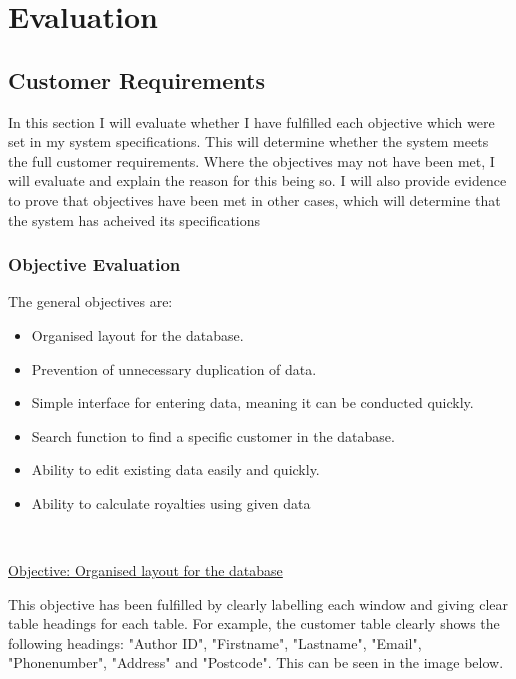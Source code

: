 \chapter{Evaluation}

\section{Customer Requirements}

In this section I will evaluate whether I have fulfilled each objective which were set in my system specifications. This will determine whether the system meets the full customer requirements. Where the objectives may not have been met, I will evaluate and explain the reason for this being so. I will also provide evidence to prove that objectives have been met in other cases, which will determine that the system has acheived its specifications

\subsection{Objective Evaluation}

The general objectives are:
\begin{itemize}
    \item Organised layout for the database.
    \item Prevention of unnecessary duplication of data.
    \item Simple interface for entering data, meaning it can be conducted quickly.
    \item Search function to find a specific customer in the database.
    \item Ability to edit existing data easily and quickly.
    \item Ability to calculate royalties using given data
\end{itemize}

\

\underline{Objective: Organised layout for the database}

This objective has been fulfilled by clearly labelling each window and giving clear table headings for each table. For example, the customer table clearly shows the following headings: "Author ID", "Firstname", "Lastname", "Email", "Phonenumber", "Address" and "Postcode". This can be seen in the image below.

